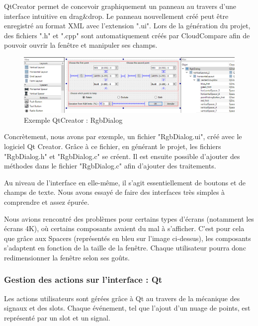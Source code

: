\documentclass[12pt,titlepage,french]{article}
\begin{document}
QtCreator permet de concevoir graphiquement un panneau au travers d'une interface intuitive en drag\&drop. Le panneau nouvellement créé peut être enregistré au format XML avec l'extension ".ui". Lors de la génération du projet, des fichiers ".h" et ".cpp" sont automatiquement créés par CloudCompare afin de pouvoir ouvrir la fenêtre et manipuler ses champs. \newline

\begin{figure}[H]
\center
  \includegraphics[width=1\textwidth]{./img/qt_creator.PNG}
  \caption{\label{} Exemple QtCreator : RgbDialog}
\end{figure}

Concrètement, nous avons par exemple, un fichier "RgbDialog.ui", créé avec le logiciel Qt Creator. Grâce à ce fichier, en générant le projet, les fichiers "RgbDialog.h" et "RgbDialog.c" se créent. Il est ensuite possible d'ajouter des méthodes dans le fichier "RgbDialog.c" afin d'ajouter des traitements. \newline

Au niveau de l'interface en elle-même, il s'agit essentiellement de boutons et de champs de texte. Nous avons essayé de faire des interfaces très simples à comprendre et assez épurée.  \newline

Nous avions rencontré des problèmes pour certains types d'écrans (notamment les écrans 4K), où certains composants avaient du mal à s'afficher. C'est pour cela que grâce aux Spacers (représentés en bleu sur l'image ci-dessus), les composants s'adaptent en fonction de la taille de la fenêtre. Chaque utilisateur pourra donc redimensionner la fenêtre selon ses goûts.

\subsubsection{Gestion des actions sur l'interface : Qt}

Les actions utilisateurs sont gérées grâce à Qt au travers de la mécanique des signaux et des slots. Chaque événement, tel que l'ajout d'un nuage de points, est représenté par un slot et un signal. \newline
\end{document}
